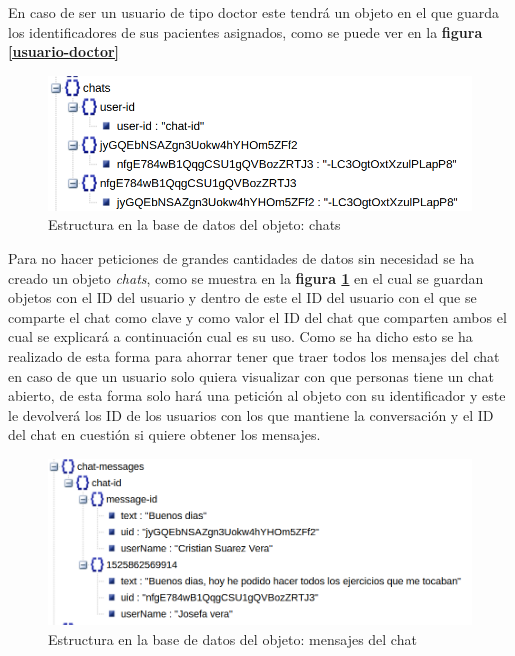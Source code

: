 En caso de ser un usuario de tipo doctor este tendrá un objeto en el que
guarda los identificadores de sus pacientes asignados, como se puede ver
en la \textbf{figura \ref{usuario-doctor}}

\medskip
\begin{figure}
    \includegraphics[width=\linewidth]{./images/chats-database.png}
    \caption{Estructura en la base de datos del objeto: chats}
    \label{chat}
\end{figure}

Para no hacer peticiones de grandes cantidades de datos sin necesidad
se ha creado un objeto \textit{chats}, como se muestra en la
\textbf{figura \ref{chat}} en el cual se guardan
objetos con el ID del usuario y dentro de este el ID del usuario con el
que se comparte el chat como clave y como valor el ID del chat que comparten
ambos el cual se explicará a continuación cual es su uso. Como se ha dicho
esto se ha realizado de esta forma para ahorrar tener que traer todos los
mensajes del chat en caso de que un usuario solo quiera visualizar con
que personas tiene un chat abierto, de esta forma solo hará una petición
al objeto con su identificador y este le devolverá los ID de los usuarios
con los que mantiene la conversación y el ID del chat en cuestión si quiere
obtener los mensajes.

\medskip
\begin{figure}
    \includegraphics[width=\linewidth]{./images/chat-messages-database.png}
    \caption{Estructura en la base de datos del objeto: mensajes del chat}
    \label{mensajes-del-chat}
\end{figure}


